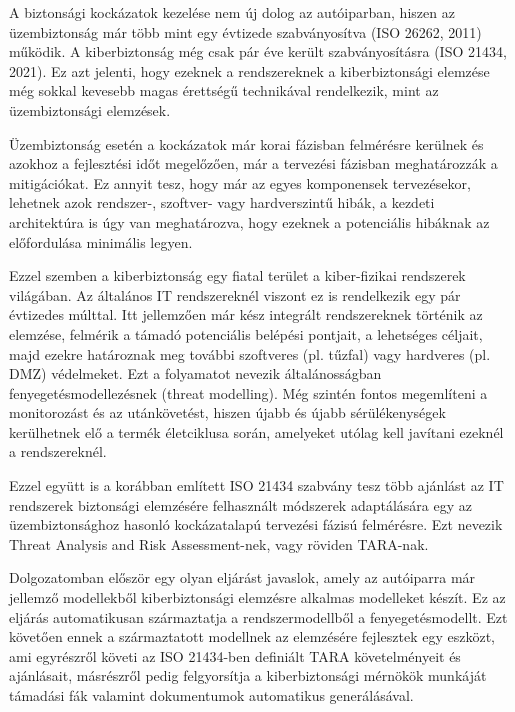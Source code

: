 
A biztonsági kockázatok kezelése nem új dolog az autóiparban, hiszen az üzembiztonság már több mint egy évtizede szabványosítva (ISO 26262, 2011) működik. A kiberbiztonság még csak pár éve került szabványosításra (ISO 21434, 2021). Ez azt jelenti, hogy ezeknek a rendszereknek a kiberbiztonsági elemzése még sokkal kevesebb magas érettségű technikával rendelkezik, mint az üzembiztonsági elemzések.

Üzembiztonság esetén a kockázatok már korai fázisban felmérésre kerülnek és azokhoz a fejlesztési időt megelőzően, már a tervezési fázisban meghatározzák a mitigációkat. Ez annyit tesz, hogy már az egyes komponensek tervezésekor, lehetnek azok rendszer-, szoftver- vagy hardverszintű hibák, a kezdeti architektúra is úgy van meghatározva, hogy ezeknek a potenciális hibáknak az előfordulása minimális legyen.

Ezzel szemben a kiberbiztonság egy fiatal terület a kiber-fizikai rendszerek világában. Az általános IT rendszereknél viszont ez is rendelkezik egy pár évtizedes múlttal. Itt jellemzően már kész integrált rendszereknek történik az elemzése, felmérik a támadó potenciális belépési pontjait, a lehetséges céljait, majd ezekre határoznak meg további szoftveres (pl. tűzfal) vagy hardveres (pl. DMZ) védelmeket. Ezt a folyamatot nevezik általánosságban fenyegetésmodellezésnek (threat modelling). Még szintén fontos megemlíteni a monitorozást és az utánkövetést, hiszen újabb és újabb sérülékenységek kerülhetnek elő a termék életciklusa során, amelyeket utólag kell javítani ezeknél a rendszereknél.

Ezzel együtt is a korábban említett ISO 21434 szabvány tesz több ajánlást az IT rendszerek biztonsági elemzésére felhasznált módszerek adaptálására egy az üzembiztonsághoz hasonló kockázatalapú tervezési fázisú felmérésre. Ezt nevezik Threat Analysis and Risk Assessment-nek, vagy röviden TARA-nak.

Dolgozatomban először egy olyan eljárást javaslok, amely az autóiparra már jellemző modellekből kiberbiztonsági elemzésre alkalmas modelleket készít. Ez az eljárás automatikusan származtatja a rendszermodellből a fenyegetésmodellt. Ezt követően ennek a származtatott modellnek az elemzésére fejlesztek egy eszközt, ami egyrészről követi az ISO 21434-ben definiált TARA követelményeit és ajánlásait, másrészről pedig felgyorsítja a kiberbiztonsági mérnökök munkáját támadási fák valamint dokumentumok automatikus generálásával.\\

